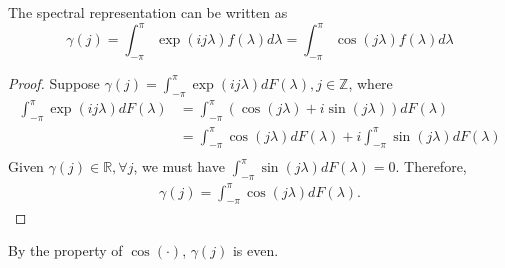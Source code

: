 \documentclass[11pt]{elegantbook}
\begin{document}
\begin{lemma}[$\int_{-\pi}^\pi \exp\left(ij\lambda\right)f(\lambda)d \lambda = \int_{-\pi}^\pi \cos(j\lambda) f(\lambda) d \lambda$]
    The spectral representation can be written as
    $$\gamma(j)=\int_{-\pi}^\pi \exp\left(ij\lambda\right)f(\lambda)d \lambda = \int_{-\pi}^\pi \cos(j\lambda) f(\lambda) d \lambda$$
\end{lemma}
\begin{proof}
    Suppose $\gamma(j)=\int_{-\pi}^\pi \exp\left(ij\lambda\right)d F(\lambda),j\in \mathbb{Z}$, where
    \begin{equation}
        \begin{aligned}
            \int_{-\pi}^\pi \exp\left(ij\lambda\right)d F(\lambda)&=\int_{-\pi}^\pi \left(\cos(j\lambda)+i\sin(j\lambda)\right)d F(\lambda)\\
            &=\int_{-\pi}^\pi \cos(j\lambda)d F(\lambda) + i\int_{-\pi}^\pi\sin(j\lambda)d F(\lambda)\\
        \end{aligned}
        \nonumber
    \end{equation}
    Given $\gamma(j)\in \mathbb{R},\forall j$, we must have $\int_{-\pi}^\pi\sin(j\lambda)d F(\lambda)=0$. Therefore,
    \begin{equation}
        \begin{aligned}
            \gamma(j)=\int_{-\pi}^\pi \cos(j\lambda)d F(\lambda).
        \end{aligned}
        \nonumber
    \end{equation}
\end{proof}
By the property of $\cos(\cdot)$, $\gamma(j)$ is even.
\end{document}
